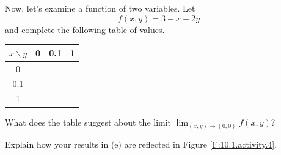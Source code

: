\begin{pa}
\item Now, let's examine a function of two variables.  Let  
  $$
  f(x,y) = 3 - x - 2y
  $$
  and complete the following table of values.

  \begin{center}
    \begin{tabular}{|c||c|c|c|}
      \hline
      $x\backslash y$ & 0 & 0.1 & 1 \\
      \hline 
      \hline
      0 & \hspace*{0.5in} & \hspace*{0.5in} & \hspace*{0.5in} \\
      \hline
      0.1 & & & \\
      \hline
      1 & & & \\
      \hline
    \end{tabular}
  \end{center}
  What does the table suggest about the limit $\lim_{(x,y)\to(0,0)} f(x,y)$?

\item Explain how your results in (e) are reflected in Figure
  \ref{F:10.1.activity.4}. 


\end{pa}

